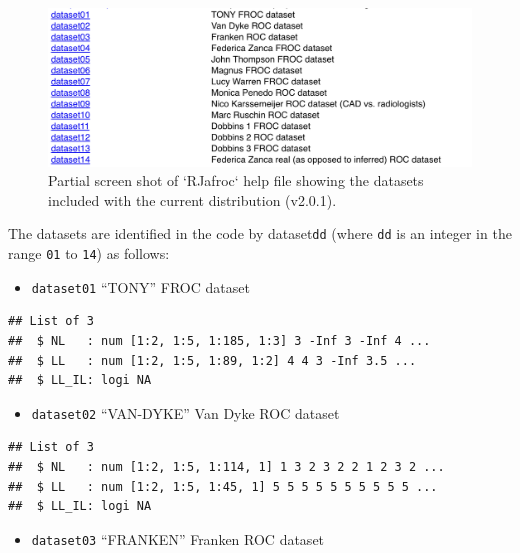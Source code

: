 \documentclass[
]{book}
\providecommand{\tightlist}{%
  \setlength{\itemsep}{0pt}\setlength{\parskip}{0pt}}
\begin{document}
\begin{figure}

{\centering \includegraphics{images/compare-3-fits/datasets} 

}

\caption{Partial screen shot of `RJafroc` help file showing the datasets included with the current distribution (v2.0.1).}\label{fig:datasets-datasets}
\end{figure}

The datasets are identified in the code by dataset\texttt{dd} (where \texttt{dd} is an integer in the range \texttt{01} to \texttt{14}) as follows:

\begin{itemize}
\tightlist
\item
  \texttt{dataset01} ``TONY'' FROC dataset \citep{chakraborty2011estimating}
\end{itemize}

\begin{verbatim}
## List of 3
##  $ NL   : num [1:2, 1:5, 1:185, 1:3] 3 -Inf 3 -Inf 4 ...
##  $ LL   : num [1:2, 1:5, 1:89, 1:2] 4 4 3 -Inf 3.5 ...
##  $ LL_IL: logi NA
\end{verbatim}

\begin{itemize}
\tightlist
\item
  \texttt{dataset02} ``VAN-DYKE'' Van Dyke ROC dataset \citep{RN1993}
\end{itemize}

\begin{verbatim}
## List of 3
##  $ NL   : num [1:2, 1:5, 1:114, 1] 1 3 2 3 2 2 1 2 3 2 ...
##  $ LL   : num [1:2, 1:5, 1:45, 1] 5 5 5 5 5 5 5 5 5 5 ...
##  $ LL_IL: logi NA
\end{verbatim}

\begin{itemize}
\tightlist
\item
  \texttt{dataset03} ``FRANKEN'' Franken ROC dataset \citep{RN1995}
\end{itemize}
\end{document}
